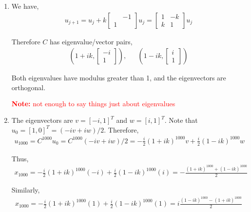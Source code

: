 \documentclass[10pt]{article}
\newcommand{\note}[1]{\textcolor{red}{\textbf{Note:} #1}}
\begin{document}
\begin{solution}[Solution]
\begin{enumerate}[label=(\alph*)]
    \item We have,
        \begin{align*}
            u_{j+1} = u_j + k \left[\begin{array}{cc}& -1 \\ 1\end{array}\right] u_j = \left[\begin{array}{rr}1 & -k \\ k & 1\end{array}\right]u_j
        \end{align*}
        
        Therefore \( C \) has eigenvalue/vector pairs,
        \begin{align*}
            \left( 1+ik, \left[\begin{array}{r}-i \\ 1\end{array}\right] \right), &&
            \left( 1-ik, \left[\begin{array}{r}i \\ 1\end{array}\right] \right)
        \end{align*}
        
        Both eigenvalues have modulus greater than 1, and the eigenvectors are orthogonal.

        \note{not enough to say things just about eigenvalues}

    \item The eigenvectors are \( v = [-i,1]^T \) and \( w = [i,1]^T \). Note that \( u_0 = [1,0]^T = (-iv + iw)/2 \). Therefore,
        \begin{align*}
            u_{1000} = C^{1000} u_0 
            = C^{1000} (-iv+iw)/2 
            = -\frac{i}{2} (1+ik)^{1000} v + \frac{i}{2}(1-ik)^{1000} w
        \end{align*}
        
        Thus,
        \begin{align*}
            x_{1000} = -\frac{i}{2} (1+ik)^{1000} (-i) + \frac{i}{2} (1-ik)^{1000}(i) 
            = -\frac{(1+ik)^{1000}+(1-ik)^{1000}}{2}
        \end{align*}

        Similarly,
        \begin{align*}
            x_{1000} = -\frac{i}{2} (1+ik)^{1000} (1) + \frac{i}{2} (1-ik)^{1000}(1)
            = i\frac{(1-ik)^{1000} - (1+ik)^{1000}}{2}
        \end{align*} 
        

\end{enumerate}
\end{solution}
\end{document}
